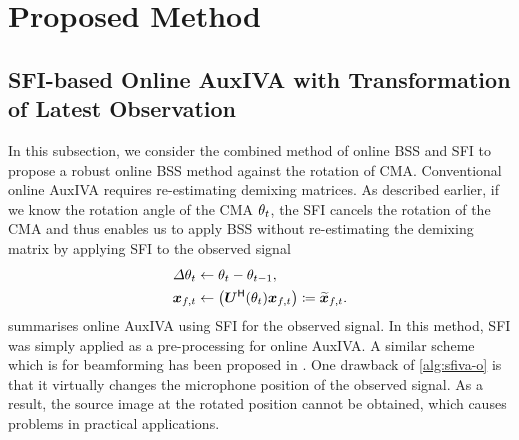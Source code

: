 \documentclass[sip,biber]{now-journal}
\begin{document}
\section{Proposed Method}\label{sec:proposed}


\subsection{SFI-based Online AuxIVA with Transformation of Latest Observation}

In this subsection, we consider the combined method of online BSS and SFI \cite{Wakabayashi:2023:ASLP} to propose a robust online BSS method against the rotation of CMA.
Conventional online AuxIVA requires re-estimating demixing matrices.
As described earlier, if we know the rotation angle of the CMA $\theta _{t}$, the SFI cancels the rotation of the CMA and thus enables us to apply BSS without re-estimating the demixing matrix by applying SFI to the observed signal
\begin{align}
  \varDelta \rotSpat _{\tframe} &\gets \rotSpat _{\tframe} - \rotSpat _{\tframe - 1}, \\
  \Obs _{\ft} &\gets \left(\rotMat ^{\hermite} (\rotSpat _{\tframe}) \Obs _{\ft}\right) \coloneqq \refpos{\Obs} _{\ft}.
\end{align}
 summarises online AuxIVA using SFI for the observed signal.
In this method, SFI was simply applied as a pre-processing for online AuxIVA.
A similar scheme which is for beamforming has been proposed in \cite{Wakabayashi:2023:ASLP}.
One drawback of \cref{alg:sfiva-o} is that it virtually changes the microphone position of the observed signal.
As a result, the source image at the rotated position cannot be obtained, which causes problems in practical applications.
\end{document}
